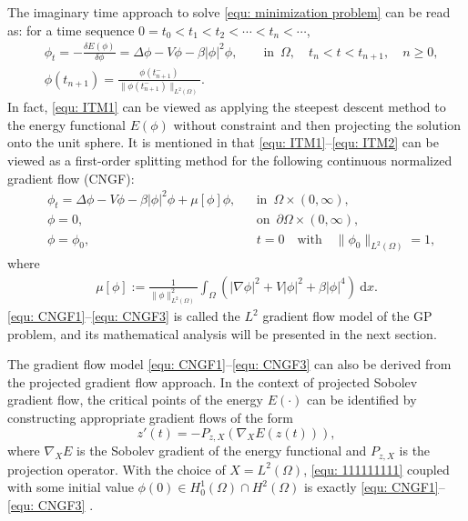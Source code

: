 \documentclass{siamart250211}
\begin{document}
The imaginary time approach to solve \eqref{equ: minimization problem} can be read as: for a time sequence $0 = t_0 < t_1 < t_2 < \cdots < t_n < \cdots$, 
\begin{align}
    &\phi_t  = - \frac{\delta E(\phi)}{\delta \phi} = \Delta \phi - V\phi - \beta |\phi|^2 \phi, \qquad \text{in}\,\,\, \Omega, \quad t_n < t < t_{n+1}, \quad n \ge 0, \label{equ: ITM1} \\
   & \phi(t_{n+1})  = \frac{\phi(t_{n+1}^{-})}{\|\phi(t_{n+1}^{-})\|_{L^2(\Omega)}}. \label{equ: ITM2}
\end{align}
In fact, \eqref{equ: ITM1} can be viewed as applying the steepest descent method to the energy functional $E(\phi)$ without constraint and then projecting the solution onto the unit sphere. It is mentioned in \cite{bao2004computing} that \eqref{equ: ITM1}--\eqref{equ: ITM2} can be viewed as a first-order splitting method for the following continuous normalized gradient flow (CNGF): 
\begin{align}
    &\phi_t = \Delta \phi - V \phi - \beta |\phi|^2 \phi + \mu[\phi]\phi,  && \text{in}\,\,\, \Omega \times (0,\infty), \label{equ: CNGF1} \\
    &\phi = 0,  && \text{on}\,\,\,\partial\Omega\times (0,\infty),  \\
    &\phi = \phi_0,  && t = 0 \quad \text{with} \quad \|\phi_0\|_{L^2(\Omega)} = 1, \label{equ: CNGF2}
\end{align}
where 
\begin{align}\label{equ: CNGF3}
    \mu[\phi]:= \frac{1}{\|\phi\|_{L^2(\Omega)}^2} \int_{\Omega}\left( |\nabla \phi|^2 + V |\phi|^2 + \beta |\phi|^4\right) \ \text{d}x.
\end{align}
\eqref{equ: CNGF1}--\eqref{equ: CNGF3} is called the $L^2$ gradient flow model of the GP problem,
and its mathematical analysis will be presented in the next section.

\begin{remark}
    The gradient flow model \eqref{equ: CNGF1}--\eqref{equ: CNGF3} can also be derived from the projected gradient flow approach. In the context of projected Sobolev gradient flow, the critical points of the energy $E(\cdot)$ can be identified by constructing appropriate gradient flows of the form 
\begin{equation}\label{equ: 111111111}
	z'(t) = - P_{z,X}(\nabla_X E(z(t))),
\end{equation}
where $\nabla_X E$ is the Sobolev gradient of the energy functional and $P_{z,X}$ is the projection operator. With the choice of $X = L^2(\Omega)$, \eqref{equ: 111111111} coupled with some initial value $\phi(0) \in H_0^1(\Omega) \cap H^2(\Omega)$ is exactly \eqref{equ: CNGF1}--\eqref{equ: CNGF3} \cite[Section 2.2.1]{henning2020sobolev}.
\end{remark}
\end{document}
